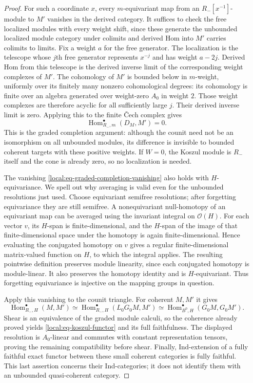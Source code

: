 \documentclass[11pt]{article}
\numberwithin{equation}{section}
\theoremstyle{definition}
\theoremstyle{remark}
\newcommand{\cO}{\mathcal O}
\newcommand{\Hom}{\operatorname{Hom}}
\begin{document}
\begin{proof}
For such a coordinate $x$, every $m$-equivariant map from an
$R_-[x^{-1}]$-module to $M'$ vanishes in the derived category.
It suffices to check the free localized modules with every weight
shift, since these generate the unbounded localized module category
under colimits and derived Hom into $M'$ carries colimits to limits.
Fix a weight $a$ for the free generator.  The localization is the
telescope whose $j$th free generator represents $x^{-j}$ and has
weight $a-2j$.  Derived Hom from this telescope is the derived
inverse limit of the corresponding weight complexes of $M'$.
The cohomology of $M'$ is bounded below in $m$-weight, uniformly
over its finitely many nonzero cohomological degrees: its cohomology
is finite over an algebra generated over weight-zero $A_0$ in
weight $2$.  Those weight complexes are therefore acyclic for all
sufficiently large $j$.  Their derived inverse limit is zero.
Applying this to the finite \v Cech complex gives
\begin{equation}\label{local:eq-graded-completion-vanishing}
 \Hom^\bullet_{R_-,m}(D_M,M')=0.
\end{equation}
This is the graded completion argument: although the counit need
not be an isomorphism on all unbounded modules, its difference is
invisible to bounded coherent targets with these positive weights.
If $W=0$, the Koszul module is $R_-$ itself and the cone is already
zero, so no localization is needed.

The vanishing \eqref{local:eq-graded-completion-vanishing} also
holds with $H$-equivariance.  We spell out why averaging is valid
even for the unbounded resolutions just used.  Choose equivariant
semifree resolutions; after forgetting equivariance they are still
semifree.  A nonequivariant null-homotopy of an equivariant map can
be averaged using the invariant integral on $\cO(H)$.  For each
vector $v$, its $H$-span is finite-dimensional, and the $H$-span
of the image of that finite-dimensional space under the homotopy
is again finite-dimensional.  Hence evaluating the conjugated
homotopy on $v$ gives a regular finite-dimensional matrix-valued
function on $H$, to which the integral applies.  The resulting
pointwise definition preserves module linearity, since each
conjugated homotopy is module-linear.  It also preserves the
homotopy identity and is $H$-equivariant.  Thus forgetting
equivariance is injective on the mapping groups in question.

Apply this vanishing to the counit triangle.  For coherent $M,M'$
it gives
\[
 \Hom^\bullet_{R_-,H}(M,M')
 \simeq\Hom^\bullet_{R_-,H}(L_0G_0M,M')
 \simeq\Hom^\bullet_{B^0,H}(G_0M,G_0M').
\]
Shear is an equivalence of the graded module calculi, so the
coherence already proved yields \eqref{local:eq-koszul-functor}
and its full faithfulness.  The displayed resolution is $A_0$-linear
and commutes with constant representation tensors, proving the
remaining compatibility before shear.  Finally, Ind-extension of
a fully faithful exact functor between these small coherent
categories is fully faithful.  This last assertion concerns their
Ind-categories; it does not identify them with an unbounded
quasi-coherent category.
\end{proof}
\end{document}
